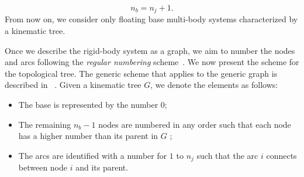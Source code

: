 \begin{equation}
    n_b = n_j + 1.
\end{equation}
From now on, we consider only floating base multi-body systems characterized by a kinematic tree. 
\par
Once we describe the rigid-body system as a graph, we aim to number the nodes and arcs following the \emph{regular numbering} scheme~\citep{Featherstone2014}. We now present the scheme for the topological tree. The generic scheme that applies to the generic graph is described in ~\citep[Section 4.1.2]{Featherstone2014}.
Given a kinematic tree $G$, we denote the elements as follows:
\begin{itemize}
    \item The base is represented by the number $0$;
    \item The remaining $n_b - 1$ nodes are numbered in any order such that each node has a higher number than its parent in $G$ ;
    \item The arcs are identified with a number for $1$ to $n_j$ such that the arc $i$ connects between node $i$ and its parent.
\end{itemize}

